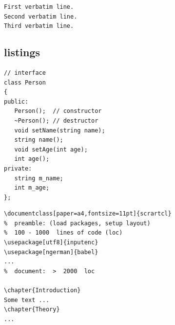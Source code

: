 %

\begin{filecontents*}{\democodefile}
\renewcommand{\FancyVerbFormatLine}[1]{%
   \ifodd\value{FancyVerbLine}%
      \MakeUppercase{#1}%
   \else%
      #1%
   \fi%
}%
\begin{Verbatim}
First verbatim line.
Second verbatim line.
Third verbatim line.
\end{Verbatim}

\renewcommand{\FancyVerbFormatLine}{}
\end{filecontents*}

%


\subsection{listings}
\label{sec:demo:listings}

\begin{filecontents*}{\democodefile}
\begin{lstlisting}[style=lstStyleCpp]
// interface
class Person
{
public:
   Person();  // constructor
   ~Person(); // destructor
   void setName(string name);
   string name();
   void setAge(int age);
   int age();
private:
   string m_name;
   int m_age;
};
\end{lstlisting}
\end{filecontents*}

%

\begin{filecontents*}{\democodefile}
\begin{lstlisting}[style=lstStyleLaTeX,
   caption={[LaTeX Listings] Lines of code in a typical LaTeX document},
   label=lstLaTeXLinesOfCode]
\documentclass[paper=a4,fontsize=11pt]{scrartcl}
%  preamble: (load packages, setup layout)
%  100 - 1000  lines of code (loc)
\usepackage[utf8]{inputenc}
\usepackage[ngerman]{babel}
...
%  document:  >  2000  loc

\chapter{Introduction}
Some text ...
\chapter{Theory}
...

\end{lstlisting}
\end{filecontents*}

